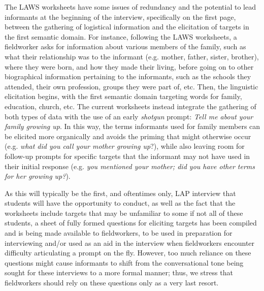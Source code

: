 \documentclass[output=paper]{langscibook}
\begin{document}
The LAWS worksheets have some issues of redundancy and the potential to lead informants at the beginning of the interview, specifically on the first page, between the gathering of logistical information and the elicitation of targets in the first semantic domain. For instance, following the LAWS worksheets, a fieldworker asks for information about various members of the family, such as what their relationship was to the informant (e.g. mother, father, sister, brother), where they were born, and how they made their living, before going on to other biographical information pertaining to the informants, such as the schools they attended, their own profession, groups they were part of, etc. Then, the linguistic elicitation begins, with the first semantic domain targeting words for family, education, church, etc. The current worksheets instead integrate the gathering of both types of data with the use of an early \textit{shotgun} prompt: \textit{Tell me about your family growing up}. In this way, the terms informants used for family members can be elicited more organically and avoids the priming that might otherwise occur (e.g. \textit{what did you call your mother growing up}?), while also leaving room for follow-up prompts for specific targets that the informant may not have used in their initial response (e.g. \textit{you mentioned your mother; did you have other terms for her growing up?}).     

As this will typically be the first, and oftentimes only, LAP interview that students will have the opportunity to conduct, as well as the fact that the worksheets include targets that may be unfamiliar to some if not all of these students, a sheet of fully formed questions for eliciting targets has been compiled and is being made available to fieldworkers, to be used in preparation for interviewing and/or used as an aid in the interview when fieldworkers encounter difficulty articulating a prompt on the fly. However, too much reliance on these questions might cause informants to shift from the conversational tone being sought for these interviews to a more formal manner; thus, we stress that fieldworkers should rely on these questions only as a very last resort. 
\end{document}
